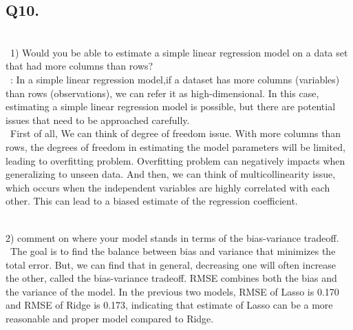 \documentclass{article}
\begin{document}
\subsection{Q10.}

\\\
1) Would you be able to estimate a simple linear regression model on a data set that had more columns than rows?
\\\
: In a simple linear regression model,if a dataset has more columns (variables) than rows (observations), we can refer it as high-dimensional. In this case, estimating a simple linear regression model is possible, but there are potential issues that need to be approached carefully.
\\\
First of all, We can think of degree of freedom issue. With more columns than rows, the degrees of freedom in estimating the model parameters will be limited, leading to overfitting problem. Overfitting problem can negatively impacts when generalizing to unseen data.
And then, we can think of multicollinearity issue, which occurs when the independent variables are highly correlated with each other. This can lead to a biased estimate of the regression coefficient.

\\
2) comment on where your model stands in terms of the bias-variance tradeoff.
\\\
The goal is to find the balance between bias and variance that minimizes the total error. But, we can find that in general, decreasing one will often increase the other, called the bias-variance tradeoff.
RMSE combines both the bias and the variance of the model. In the previous two models, RMSE of Lasso is 0.170 and RMSE of Ridge is 0.173, indicating that estimate of Lasso can be a more reasonable and proper model compared to Ridge.
\end{document}
